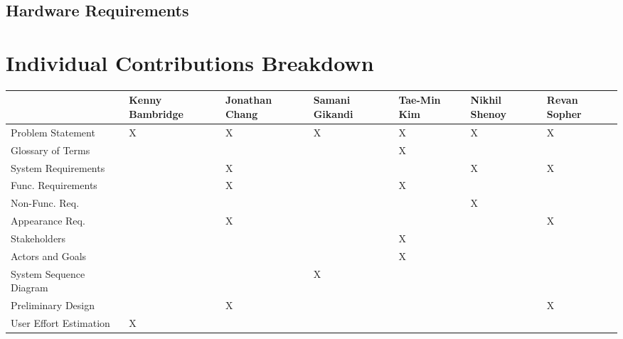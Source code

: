 \documentclass[letterpaper,english, 12pt]{scrreprt}
\begin{document}
\section{Hardware Requirements}
    
    


\chapter*{Individual Contributions Breakdown}
\begin{center}
    \begin{tabular}{|l|C{2cm}|C{1.5cm}|C{1.5cm}|C{1.5cm}|C{1.5cm}|C{1.5cm}|}
        \hline
            &   Kenny Bambridge     &   Jonathan Chang      &   Samani Gikandi      &   Tae-Min Kim &     Nikhil Shenoy     &   Revan Sopher\\ \hline
Problem Statement   &       X       &       X       &       X       &       X   &       X       &   X       \\ \hline
Glossary of Terms   &               &               &               &       X   &               &           \\ \hline
System Requirements &               &       X       &               &           &       X       &   X   \\ \hline
Func. Requirements  &               &       X       &               &       X   &               &       \\ \hline
Non-Func. Req.      &               &               &               &           &       X       &       \\ \hline
Appearance Req.     &               &       X       &               &           &               &       X\\ \hline
Stakeholders        &               &               &               &       X   &               &        \\ \hline
Actors and Goals    &               &               &               &       X   &               &        \\ \hline
System Sequence Diagram &               &               &       X       &           &               &        \\ \hline
Preliminary Design  &               &       X       &               &           &               &   X    \\ \hline
User Effort Estimation  &       X       &               &               &           &               &        \\ \hline

\end{tabular}
\end{center}
\end{document}
